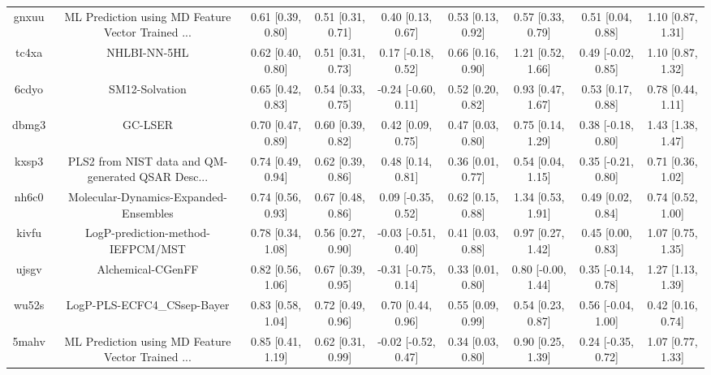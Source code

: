 \documentclass{article}
\begin{document}
\begin{center}
\begin{longtable}{|ccccccccc|}
 gnxuu &  ML Prediction using MD Feature Vector Trained ... &  0.61 [0.39, 0.80] &  0.51 [0.31, 0.71] &     0.40 [0.13, 0.67] &  0.53 [0.13, 0.92] &    0.57 [0.33, 0.79] &    0.51 [0.04, 0.88] &     1.10 [0.87, 1.31] \\
 tc4xa &                                       NHLBI-NN-5HL &  0.62 [0.40, 0.80] &  0.51 [0.31, 0.73] &    0.17 [-0.18, 0.52] &  0.66 [0.16, 0.90] &    1.21 [0.52, 1.66] &   0.49 [-0.02, 0.85] &     1.10 [0.87, 1.32] \\
 6cdyo &                                     SM12-Solvation &  0.65 [0.42, 0.83] &  0.54 [0.33, 0.75] &   -0.24 [-0.60, 0.11] &  0.52 [0.20, 0.82] &    0.93 [0.47, 1.67] &    0.53 [0.17, 0.88] &     0.78 [0.44, 1.11] \\
 dbmg3 &                                            GC-LSER &  0.70 [0.47, 0.89] &  0.60 [0.39, 0.82] &     0.42 [0.09, 0.75] &  0.47 [0.03, 0.80] &    0.75 [0.14, 1.29] &   0.38 [-0.18, 0.80] &     1.43 [1.38, 1.47] \\
 kxsp3 &  PLS2 from NIST data and QM-generated QSAR Desc... &  0.74 [0.49, 0.94] &  0.62 [0.39, 0.86] &     0.48 [0.14, 0.81] &  0.36 [0.01, 0.77] &    0.54 [0.04, 1.15] &   0.35 [-0.21, 0.80] &     0.71 [0.36, 1.02] \\
 nh6c0 &              Molecular-Dynamics-Expanded-Ensembles &  0.74 [0.56, 0.93] &  0.67 [0.48, 0.86] &    0.09 [-0.35, 0.52] &  0.62 [0.15, 0.88] &    1.34 [0.53, 1.91] &    0.49 [0.02, 0.84] &     0.74 [0.52, 1.00] \\
 kivfu &                  LogP-prediction-method-IEFPCM/MST &  0.78 [0.34, 1.08] &  0.56 [0.27, 0.90] &   -0.03 [-0.51, 0.40] &  0.41 [0.03, 0.88] &    0.97 [0.27, 1.42] &    0.45 [0.00, 0.83] &     1.07 [0.75, 1.35] \\
 ujsgv &                                  Alchemical-CGenFF &  0.82 [0.56, 1.06] &  0.67 [0.39, 0.95] &   -0.31 [-0.75, 0.14] &  0.33 [0.01, 0.80] &   0.80 [-0.00, 1.44] &   0.35 [-0.14, 0.78] &     1.27 [1.13, 1.39] \\
 wu52s &                        LogP-PLS-ECFC4\_CSsep-Bayer &  0.83 [0.58, 1.04] &  0.72 [0.49, 0.96] &     0.70 [0.44, 0.96] &  0.55 [0.09, 0.99] &    0.54 [0.23, 0.87] &   0.56 [-0.04, 1.00] &     0.42 [0.16, 0.74] \\
 5mahv &  ML Prediction using MD Feature Vector Trained ... &  0.85 [0.41, 1.19] &  0.62 [0.31, 0.99] &   -0.02 [-0.52, 0.47] &  0.34 [0.03, 0.80] &    0.90 [0.25, 1.39] &   0.24 [-0.35, 0.72] &     1.07 [0.77, 1.33] \\

\end{longtable}
\end{center}
\end{document}
